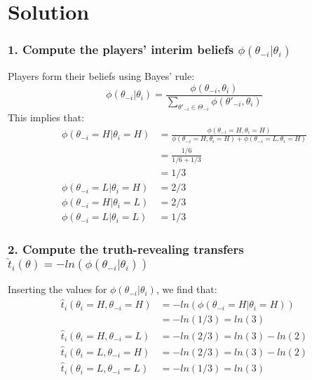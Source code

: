 \documentclass[a4paper]{article}
\newif\ifsolutions
\begin{document}
\ifsolutions
\section*{Solution}
	
	\subsubsection*{1. Compute the players' interim beliefs $\phi(\theta_{-i}|\theta_{i})$}
	Players form their beliefs using Bayes' rule:
	\begin{equation}
		\phi(\theta_{-i}|\theta_{i})=\frac{\phi(\theta_{-i},\theta_{i})}{\sum_{\theta'_{-i}\in\Theta_{-i}}\phi(\theta'_{-i},\theta_{i})}
	\end{equation}
	This implies that: 
	\begin{align}
		\phi(\theta_{-i}=H|\theta_{i}=H) &= \frac{\phi(\theta_{-i}=H,\theta_{i}=H)}{\phi(\theta_{-i}=H,\theta_{i}=H)+\phi(\theta_{-i}=L,\theta_{i}=H)} \nonumber \\ 
		&= \frac{1/6}{1/6 + 1/3} \nonumber \\ 
		&= 1/3\\
		\phi(\theta_{-i}=L|\theta_{i}=H)&=2/3\\
		\phi(\theta_{-i}=H|\theta_{i}=L)&=2/3\\
		\phi(\theta_{-i}=L|\theta_{i}=L)&=1/3
	\end{align}
	
	
	\subsubsection*{2. Compute the truth-revealing transfers $\hat{t}_{i}(\theta)=-ln(\phi(\theta_{-i}|\theta_{i}))$}
	Inserting the values for $\phi(\theta_{-i}|\theta_{i})$, we find that:
	\begin{align}
		\hat{t}_{i}(\theta_{i}=H,\theta_{-i}=H)&=-ln(\phi(\theta_{-i}=H|\theta_{i}=H)) \nonumber \\ 
		&= -ln(1/3) = ln(3)\\
		\hat{t}_{i}(\theta_{i}=H,\theta_{-i}=L)&=-ln(2/3)=ln(3)-ln(2)\\
		\hat{t}_{i}(\theta_{i}=L,\theta_{-i}=H)&=-ln(2/3)=ln(3)-ln(2)\\
		\hat{t}_{i}(\theta_{i}=L,\theta_{-i}=L)&=-ln(1/3)=ln(3)
	\end{align}
	
	
\end{document}
